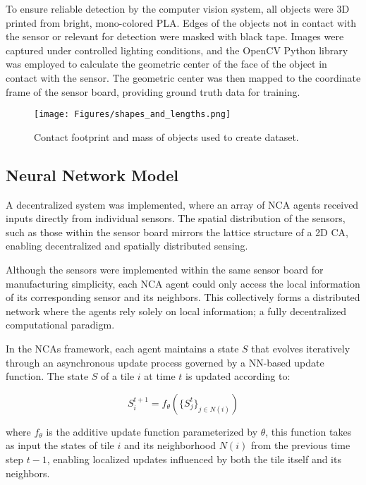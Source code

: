 To ensure reliable detection by the  computer vision system, all objects were 3D printed from bright, mono-colored PLA. Edges of the objects not in contact with the sensor or relevant for detection were masked with black tape. Images were captured under controlled lighting conditions, and the OpenCV Python library was employed to calculate the geometric center of the face of the object in contact with the sensor. The geometric center was then mapped to the coordinate frame of the sensor board, providing ground truth data for training. 

\begin{figure*}[t]
\centerline{\texttt{[image: Figures/shapes\_and\_lengths.png]}}
\caption{Contact footprint and mass of objects used to create dataset.}
\label{fig:shapes}
\end{figure*}






\subsection{Neural Network Model}
\label{sectionNNmodel}
A decentralized system was implemented, where an array of \ac{NCA} agents received inputs directly from individual sensors. The spatial distribution of the sensors, such as those within the sensor board mirrors the lattice structure of a 2D \ac{CA}, enabling decentralized and spatially distributed sensing.

Although the sensors were implemented within the same sensor board for manufacturing simplicity, each \ac{NCA} agent could only access the local information of its corresponding sensor and its neighbors. This collectively forms a distributed network where the agents rely solely on local information; a fully decentralized computational paradigm. 

In the \acp{NCA} framework, each agent maintains a state $S$ that evolves iteratively through an asynchronous update process governed by a \ac{NN}-based update function. The state $S$ of a tile $i$ at time $t$ is updated according to:

\begin{equation}
    S_{i}^{t+1} = f_{\theta} ( \{ S_{j}^{t} \}_{j\in N(i) } )
\end{equation}

where $f_\theta$ is the additive update function parameterized by $\theta$, this function takes as input the states of tile $i$ and its neighborhood $N(i)$ from the previous time step $t-1$, enabling localized updates influenced by both the tile itself and its neighbors.


